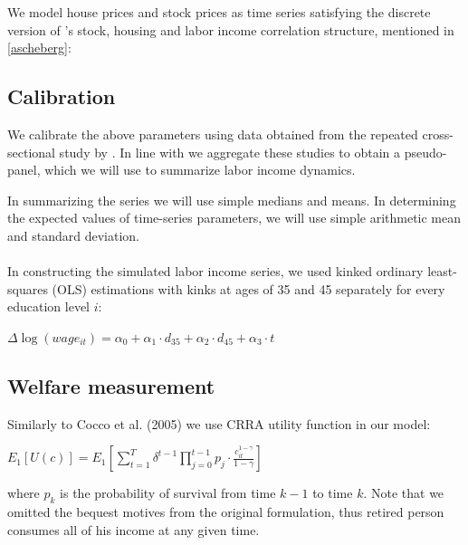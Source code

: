 \documentclass[]{elsarticle}
\begin{document}
We model house prices and stock prices as time series satisfying the discrete version of \citet{ascheberg}'s stock, housing and labor income correlation structure, mentioned in \ref{ascheberg}:


\subsection{Calibration}

We calibrate the above parameters using data obtained from the repeated cross-sectional study by \citet{tuik}. In line with \citet{aktug} we aggregate these studies to obtain a pseudo-panel, which we will use to summarize labor income dynamics.

In summarizing the series we will use simple medians and means. In determining the expected values of time-series parameters, we will use simple arithmetic mean and standard deviation.

\paragraph{}
In constructing the simulated labor income series, we used kinked ordinary least-squares (OLS) estimations with kinks at ages of 35 and 45 separately for every education level $i$:

\begin{center}
	$\Delta\log (wage_{it}) = \alpha_0 + \alpha_1 \cdot d_{35} + \alpha_2 \cdot d_{45} + \alpha_3 \cdot t$
\end{center}




\subsection{Welfare measurement}
Similarly to Cocco et al. (2005) we use CRRA utility function in our model:

\begin{center}
	$E_1[U(c)] = E_1 \left[\displaystyle\sum^T_{t=1} \delta^{t-1} \displaystyle\prod^{t-1}_{j=0} p_j \cdot \frac{c^{1-\gamma}_{it}}{1-\gamma}\right]$
\end{center}

where $p_k$ is the probability of survival from time $k-1$ to time $k$. Note that we omitted the bequest motives from the original formulation, thus retired person consumes all of his income at any given time.

\end{document}
